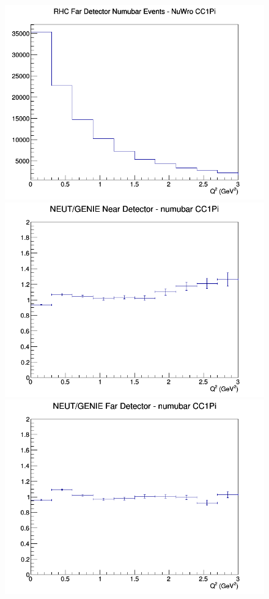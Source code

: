 \begin{figure}[h]
\endminipage
{}
\includegraphics[width=\linewidth]{eff_Q2/LAr/CC1Pi_RHC_FD_numubar_Q2_NuWro.png}
\endminipage
\newline
{}
\includegraphics[width=\linewidth]{eff_Q2/LAr/ratios/CC1Pi_NEUT_GENIE_numubar_near_Q2.png}
\endminipage
{}
\includegraphics[width=\linewidth]{eff_Q2/LAr/ratios/CC1Pi_NEUT_GENIE_numubar_far_Q2.png}

\end{figure}
